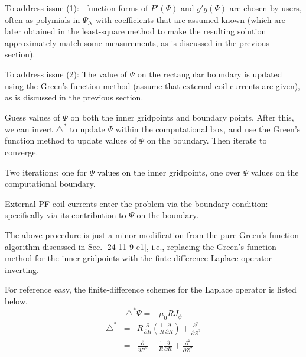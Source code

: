 \documentclass{llncs}
\begin{document}
To address issue (1): \ function forms of $P' (\Psi)$ and $g' g (\Psi)$ are
chosen by users, often as polymials in $\Psi_N$ with coefficients that are
assumed known (which are later obtained in the least-square method to make the
resulting solution approximately match some measurements, as is discussed in
the previous section).

To address issue (2): The value of $\Psi$ on the rectangular boundary is
updated using the Green's function method (assume that external coil currents
are given), as is discussed in the previous section.

Guess values of $\Psi$ on both the inner gridpoints and boundary points. After
this, we can invert $\triangle^{\ast}$ to update $\Psi$ within the
computational box, and use the Green's function method to update values of
$\Psi$ on the boundary. Then iterate to converge.

Two iterations: one for $\Psi$ values on the inner gridpoints, one over $\Psi$
values on the computational boundary.

External PF coil currents enter the problem via the boundary condition:
specifically via its contribution to $\Psi$ on the boundary.

The above procedure is just a minor modification from the pure Green's
function algorithm discussed in Sec. \ref{24-11-9-e1}, i.e., replacing the
Green's function method for the inner gridpoints with the finte-difference
Laplace operator inverting.

For reference easy, the finite-difference schemes for the Laplace operator is
listed below.
\begin{equation}
  \triangle^{\ast} \Psi = - \mu_0 R J_{\phi}
\end{equation}
\begin{eqnarray}
  \triangle^{\ast} & = & R \frac{\partial}{\partial R} \left( \frac{1}{R}
  \frac{\partial}{\partial R} \right) + \frac{\partial^2}{\partial Z^2} 
  \label{24-7-24-p1}\\
  & = & \frac{\partial}{\partial R^2} - \frac{1}{R} \frac{\partial}{\partial
  R} + \frac{\partial^2}{\partial Z^2}  \label{24-7-24-p2}
\end{eqnarray}
\end{document}
